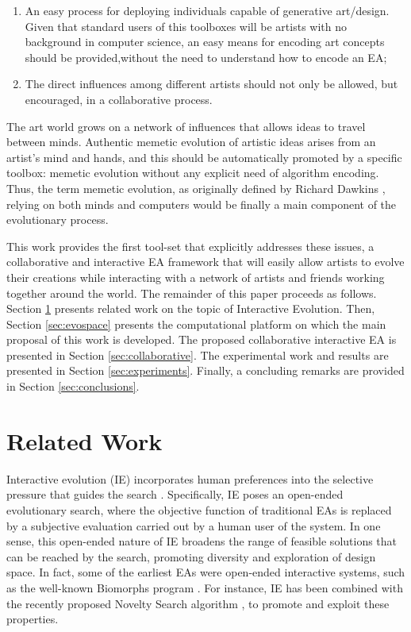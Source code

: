 \documentclass{llncs}
\begin{document}
\begin{enumerate}

	\item An easy process for deploying individuals capable of generative art/design. Given that standard users of this toolboxes will be artists with no background in computer science, an easy means for encoding art concepts should be provided,without the need to understand how to encode an EA;

	\item The direct influences among different artists should not only be allowed, but encouraged, in a collaborative process.

\end{enumerate}

The art world grows on a network of influences that allows ideas to travel between minds.
Authentic memetic  %
evolution of artistic ideas arises from an artist's mind and hands, and this should be automatically promoted by a specific toolbox:
memetic evolution without any explicit need of algorithm encoding.
Thus, the term memetic evolution, as originally defined by Richard Dawkins \cite{r.dawkins1976the-selfish-gen}, relying on both minds and computers
would be finally a main component of the evolutionary process.

This work provides the first tool-set that explicitly addresses these issues, a collaborative and interactive EA framework that will easily
allow artists to evolve their creations while interacting
with a network of artists and friends working together around the world.
The remainder of this paper proceeds as follows.
Section \ref{sec:interactive} presents related work on the topic of Interactive Evolution.
Then, Section \ref{sec:evospace} presents the computational platform on which the main proposal of this work is developed.
The proposed collaborative interactive EA is presented in Section \ref{sec:collaborative}.
The experimental work and results are presented in Section \ref{sec:experiments}.
Finally, a concluding remarks are provided in Section \ref{sec:conclusions}.


\section{Related Work}
\label{sec:interactive}
Interactive evolution (IE) incorporates human preferences into the selective pressure that guides the search \cite{ie1,ie2}.
Specifically, IE poses an open-ended evolutionary search, where the objective function of traditional EAs is replaced by a subjective evaluation carried out by a human user of the system.
In one sense, this open-ended nature of IE  broadens the range of feasible solutions that can be reached by the search,
promoting diversity and exploration of design space.
In fact, some of the earliest EAs were open-ended interactive systems, such as the well-known Biomorphs program \cite{biomorphs}.
For instance, IE has been combined with the recently proposed Novelty Search algorithm \cite{ns:2012}, to promote and exploit these properties.
\end{document}
